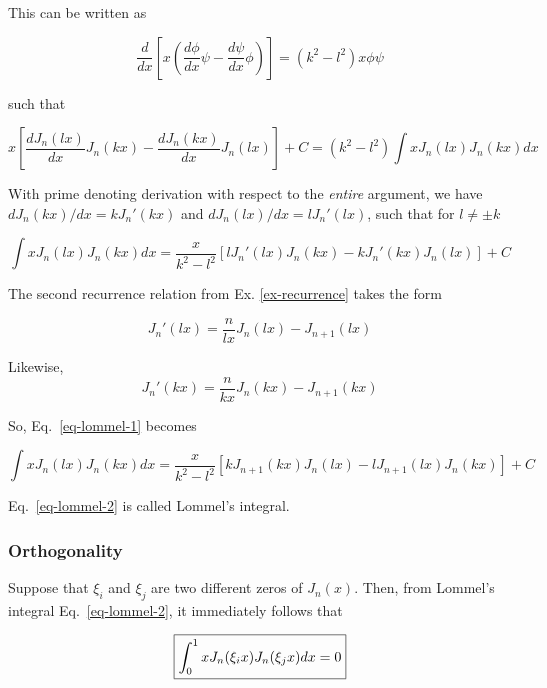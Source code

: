 This can be written as

\begin{equation}
\frac{d}{dx}\left[x \left( \frac{d \phi}{dx} \psi - \frac{d \psi}{dx} \phi\right)\right] = \left(k^2 - l^2\right) x \phi \psi
\end{equation}

such that

\begin{equation}
x \left[{\frac{dJ_n(lx)}{dx}  J_n(kx) - \frac{dJ_n(kx)}{dx} J_n(lx)}\right] + C = \left(k^2 - l^2\right)\int x J_n(lx)J_n(kx)dx
\end{equation}

With prime denoting derivation with respect to the \emph{entire} argument, we have $dJ_n(kx)/dx = kJ_n'(kx)$ and $dJ_n(lx)/dx = lJ_n'(lx)$, such that for $l \ne \pm k$

\begin{equation}
\int x J_n(lx)J_n(kx)dx = \frac{x}{k^2 - l^2} \left[{l J_n'(lx) J_n(kx) -  k J_n'(kx) J_n(lx)}\right] + C \label{eq-lommel-1}
\end{equation} 

The second recurrence relation from Ex. \ref{ex-recurrence} takes the form

\begin{equation}
J_n'(lx) =  \frac{n}{lx}J_n(lx)-J_{n+1}(lx)
\end{equation} 

Likewise,
\begin{equation}
J_n'(kx) =  \frac{n}{kx}J_n(kx)-J_{n+1}(kx)
\end{equation} 

So, Eq.~\ref{eq-lommel-1} becomes

\begin{equation}
\int x J_n(lx)J_n(kx)dx = \frac{x}{k^2 - l^2} \left[{k J_{n+1}(kx) J_n(lx) - l J_{n+1}(lx) J_n(kx)}\right] + C \label{eq-lommel-2}
\end{equation} 

Eq.~\ref{eq-lommel-2} is called Lommel's integral.

\subsubsection{Orthogonality}

Suppose that $\xi_i$ and $\xi_j$ are two different zeros of $J_n(x)$. Then, from Lommel's integral Eq.~\ref{eq-lommel-2}, it immediately follows that

\begin{equation}
\fbox{$\displaystyle
\int_0^1 x J_n(\xi_i x)J_n(\xi_j x)dx = 0 \label{eq-bessel-ortho}
$}
\end{equation} 

